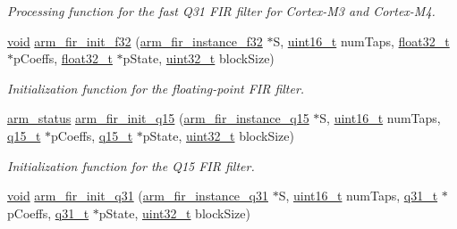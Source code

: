\begin{DoxyCompactItemize}
\begin{DoxyCompactList}\small\item\em Processing function for the fast Q31 F\-I\-R filter for Cortex-\/\-M3 and Cortex-\/\-M4. \end{DoxyCompactList}\item 
\hyperlink{group___n_a_m_e_ga18028b8badbf1ea7e704ccac3c488e82}{void} \hyperlink{group___f_i_r_ga98d13def6427e29522829f945d0967db}{arm\-\_\-fir\-\_\-init\-\_\-f32} (\hyperlink{structarm__fir__instance__f32}{arm\-\_\-fir\-\_\-instance\-\_\-f32} $\ast$S, \hyperlink{stdint_8h_a273cf69d639a59973b6019625df33e30}{uint16\-\_\-t} num\-Taps, \hyperlink{arm__math_8h_a4611b605e45ab401f02cab15c5e38715}{float32\-\_\-t} $\ast$p\-Coeffs, \hyperlink{arm__math_8h_a4611b605e45ab401f02cab15c5e38715}{float32\-\_\-t} $\ast$p\-State, \hyperlink{stdint_8h_a435d1572bf3f880d55459d9805097f62}{uint32\-\_\-t} block\-Size)
\begin{DoxyCompactList}\small\item\em Initialization function for the floating-\/point F\-I\-R filter. \end{DoxyCompactList}\item 
\hyperlink{arm__math_8h_a5e459c6409dfcd2927bb8a57491d7cf6}{arm\-\_\-status} \hyperlink{group___f_i_r_gae2a50f692f41ba57e44ed0719b1368bd}{arm\-\_\-fir\-\_\-init\-\_\-q15} (\hyperlink{structarm__fir__instance__q15}{arm\-\_\-fir\-\_\-instance\-\_\-q15} $\ast$S, \hyperlink{stdint_8h_a273cf69d639a59973b6019625df33e30}{uint16\-\_\-t} num\-Taps, \hyperlink{arm__math_8h_ab5a8fb21a5b3b983d5f54f31614052ea}{q15\-\_\-t} $\ast$p\-Coeffs, \hyperlink{arm__math_8h_ab5a8fb21a5b3b983d5f54f31614052ea}{q15\-\_\-t} $\ast$p\-State, \hyperlink{stdint_8h_a435d1572bf3f880d55459d9805097f62}{uint32\-\_\-t} block\-Size)
\begin{DoxyCompactList}\small\item\em Initialization function for the Q15 F\-I\-R filter. \end{DoxyCompactList}\item 
\hyperlink{group___n_a_m_e_ga18028b8badbf1ea7e704ccac3c488e82}{void} \hyperlink{group___f_i_r_gac00d53af87684cbbe135767b55e748a5}{arm\-\_\-fir\-\_\-init\-\_\-q31} (\hyperlink{structarm__fir__instance__q31}{arm\-\_\-fir\-\_\-instance\-\_\-q31} $\ast$S, \hyperlink{stdint_8h_a273cf69d639a59973b6019625df33e30}{uint16\-\_\-t} num\-Taps, \hyperlink{arm__math_8h_adc89a3547f5324b7b3b95adec3806bc0}{q31\-\_\-t} $\ast$p\-Coeffs, \hyperlink{arm__math_8h_adc89a3547f5324b7b3b95adec3806bc0}{q31\-\_\-t} $\ast$p\-State, \hyperlink{stdint_8h_a435d1572bf3f880d55459d9805097f62}{uint32\-\_\-t} block\-Size)

\end{DoxyCompactItemize}
